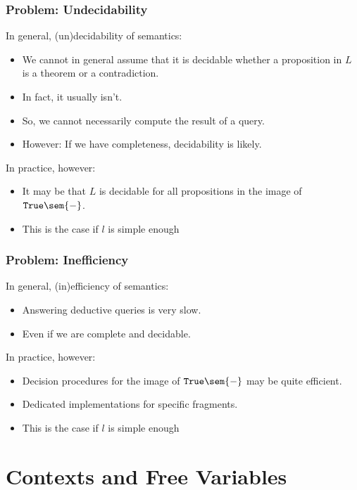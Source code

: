 \begin{frame}\frametitle{Problem: Undecidability}
In general, (un)decidability of semantics:
\begin{itemize}
\item We cannot in general assume that it is decidable whether a proposition in $L$ is a theorem or a contradiction.
\item In fact, it usually isn't.
\item So, we cannot necessarily compute the result of a query.
\item However: If we have completeness, decidability is likely.
\end{itemize}

In practice, however:
\begin{itemize}
\item It may be that $L$ is decidable for all propositions in the image of $\truelift\sem{-}$.
\item This is the case if $l$ is simple enough 
\end{itemize}
\end{frame}

\begin{frame}\frametitle{Problem: Inefficiency}
In general, (in)efficiency of semantics:
\begin{itemize}
\item Answering deductive queries is very slow.
\item Even if we are complete and decidable.
\end{itemize}

In practice, however:
\begin{itemize}
\item Decision procedures for the image of $\truelift\sem{-}$ may be quite efficient.
\item Dedicated implementations for specific fragments.
\item This is the case if $l$ is simple enough 
\end{itemize}
\end{frame}

\section{Contexts and Free Variables}

